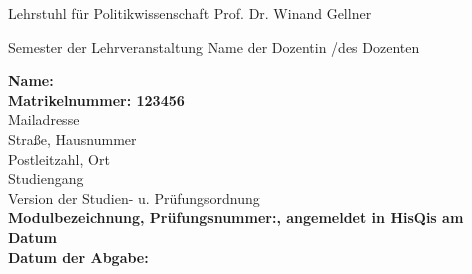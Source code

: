 \begin{titlepage}

    {Lehrstuhl für Politikwissenschaft}
    {Prof. Dr. Winand Gellner}

    \vspace{4cm}

    {Semester der Lehrveranstaltung}
    {Name der Dozentin /des Dozenten}

    \titel{\thetitle}

    \vspace*{\fill}

    \begin{flushleft}
        \textbf{Name: \theauthor}\\
        \textbf{Matrikelnummer: 123456}\\[0.5cm]
        Mailadresse\\
        Straße, Hausnummer\\
        Postleitzahl, Ort\\[0.5cm]
        Studiengang\\
        Version der Studien- u. Prüfungsordnung\\[2cm]
        \textbf{Modulbezeichnung, Prüfungsnummer:, angemeldet in HisQis am Datum}\\
        \textbf{Datum der Abgabe: \thedate}
    \end{flushleft}

\end{titlepage}